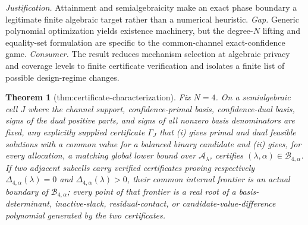 \documentclass{article}
\newtheorem{theorem}{Theorem}
\begin{document}
\par\smallskip\noindent \textit{Justification.} Attainment and semialgebraicity make an exact phase boundary a legitimate finite algebraic target rather than a numerical heuristic. \textit{Gap.} Generic polynomial optimization yields existence machinery, but the degree-\(N\) lifting and equality-set formulation are specific to the common-channel exact-confidence game. \textit{Consumer.} The result reduces mechanism selection at algebraic privacy and coverage levels to finite certificate verification and isolates a finite list of possible design-regime changes.

\begin{theorem}[thm:certificate-characterization]\label{thm:certificate-characterization}
Fix \(N=4\).  On a semialgebraic cell \(J\) where the channel support, confidence-primal basis, confidence-dual basis, signs of the dual positive parts, and signs of all nonzero basis denominators are fixed, any explicitly supplied certificate \(\Gamma_J\) that (i) gives primal and dual feasible solutions with a common value for a balanced binary candidate and (ii) gives, for every allocation, a matching global lower bound over \(\mathcal A_\lambda\), certifies \((\lambda,\alpha)\in\mathcal B_{4,\alpha}\).  If two adjacent subcells carry verified certificates proving respectively \(\Delta_{4,\alpha}(\lambda)=0\) and \(\Delta_{4,\alpha}(\lambda)>0\), their common internal frontier is an actual boundary of \(\mathcal B_{4,\alpha}\); every point of that frontier is a real root of a basis-determinant, inactive-slack, residual-contact, or candidate-value-difference polynomial generated by the two certificates.
\end{theorem}
\end{document}
